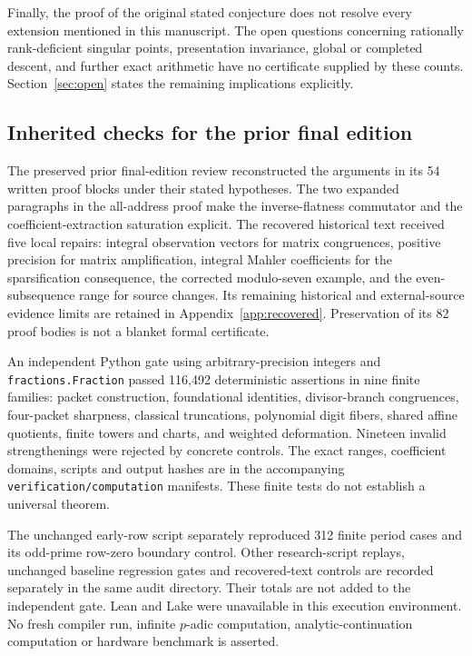 Finally, the proof of the original stated conjecture does not resolve every
extension mentioned in this manuscript. The open questions concerning
rationally rank-deficient singular points, presentation invariance, global
or completed descent, and further exact arithmetic have no certificate
supplied by these counts. Section~\ref{sec:open} states the remaining implications explicitly.

\subsection{Inherited checks for the prior final edition}
The preserved prior final-edition review reconstructed the arguments in its 54 written
proof blocks under their stated hypotheses. The two expanded paragraphs
in the all-address proof make the inverse-flatness commutator and the
coefficient-extraction saturation explicit. The recovered historical text
received five local repairs: integral observation vectors for matrix
congruences, positive precision for matrix amplification, integral Mahler
coefficients for the sparsification consequence, the corrected modulo-seven
example, and the even-subsequence range for source changes. Its remaining
historical and external-source evidence limits are retained in
Appendix~\ref{app:recovered}. Preservation of its 82 proof bodies is not
a blanket formal certificate.

An independent Python gate using arbitrary-precision integers and
\texttt{fractions.Fraction} passed 116,492 deterministic assertions in nine
finite families: packet construction, foundational identities, divisor-branch
congruences, four-packet sharpness, classical truncations, polynomial digit
fibers, shared affine quotients, finite towers and charts, and weighted
deformation. Nineteen invalid strengthenings were rejected by concrete
controls. The exact ranges, coefficient domains, scripts and output hashes
are in the accompanying \nolinkurl{verification/computation} manifests.
These finite tests do not establish a universal theorem.

The unchanged early-row script separately reproduced 312 finite period
cases and its odd-prime row-zero boundary control. Other research-script
replays, unchanged baseline regression gates and recovered-text controls
are recorded separately in the same audit directory. Their totals are
not added to the independent gate. Lean and Lake were unavailable in this
execution environment. No fresh compiler run, infinite $p$-adic computation,
analytic-continuation computation or hardware benchmark is asserted.


